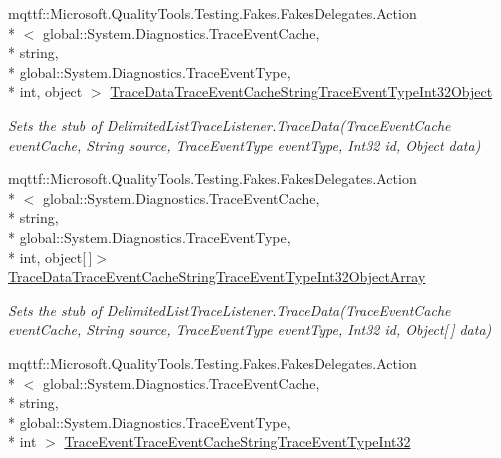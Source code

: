 \begin{DoxyCompactItemize}
mqttf\-::\-Microsoft.\-Quality\-Tools.\-Testing.\-Fakes.\-Fakes\-Delegates.\-Action\\*
$<$ global\-::\-System.\-Diagnostics.\-Trace\-Event\-Cache, \\*
string, \\*
global\-::\-System.\-Diagnostics.\-Trace\-Event\-Type, \\*
int, object $>$ \hyperlink{class_system_1_1_diagnostics_1_1_fakes_1_1_stub_delimited_list_trace_listener_a95242a7b9e103ebe344497f442777181}{Trace\-Data\-Trace\-Event\-Cache\-String\-Trace\-Event\-Type\-Int32\-Object}
\begin{DoxyCompactList}\small\item\em Sets the stub of Delimited\-List\-Trace\-Listener.\-Trace\-Data(\-Trace\-Event\-Cache event\-Cache, String source, Trace\-Event\-Type event\-Type, Int32 id, Object data)\end{DoxyCompactList}\item 
mqttf\-::\-Microsoft.\-Quality\-Tools.\-Testing.\-Fakes.\-Fakes\-Delegates.\-Action\\*
$<$ global\-::\-System.\-Diagnostics.\-Trace\-Event\-Cache, \\*
string, \\*
global\-::\-System.\-Diagnostics.\-Trace\-Event\-Type, \\*
int, object\mbox{[}$\,$\mbox{]}$>$ \hyperlink{class_system_1_1_diagnostics_1_1_fakes_1_1_stub_delimited_list_trace_listener_a6b261f203b362239eca7dd2aa8afb8eb}{Trace\-Data\-Trace\-Event\-Cache\-String\-Trace\-Event\-Type\-Int32\-Object\-Array}
\begin{DoxyCompactList}\small\item\em Sets the stub of Delimited\-List\-Trace\-Listener.\-Trace\-Data(\-Trace\-Event\-Cache event\-Cache, String source, Trace\-Event\-Type event\-Type, Int32 id, Object\mbox{[}$\,$\mbox{]} data)\end{DoxyCompactList}\item 
mqttf\-::\-Microsoft.\-Quality\-Tools.\-Testing.\-Fakes.\-Fakes\-Delegates.\-Action\\*
$<$ global\-::\-System.\-Diagnostics.\-Trace\-Event\-Cache, \\*
string, \\*
global\-::\-System.\-Diagnostics.\-Trace\-Event\-Type, \\*
int $>$ \hyperlink{class_system_1_1_diagnostics_1_1_fakes_1_1_stub_delimited_list_trace_listener_ac06fe1f6679fff2d7a5672ea34b75af2}{Trace\-Event\-Trace\-Event\-Cache\-String\-Trace\-Event\-Type\-Int32}

\end{DoxyCompactItemize}
